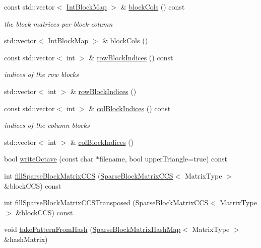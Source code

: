 \begin{DoxyCompactItemize}
const std\+::vector$<$ \hyperlink{classg2o_1_1SparseBlockMatrix_aaa6ca1ae454ed70f62992b6401645f4e}{Int\+Block\+Map} $>$ \& \hyperlink{classg2o_1_1SparseBlockMatrix_a8e53797223fff106487d0b0080a3e36e}{block\+Cols} () const 
\begin{DoxyCompactList}\small\item\em the block matrices per block-\/column \end{DoxyCompactList}\item 
std\+::vector$<$ \hyperlink{classg2o_1_1SparseBlockMatrix_aaa6ca1ae454ed70f62992b6401645f4e}{Int\+Block\+Map} $>$ \& \hyperlink{classg2o_1_1SparseBlockMatrix_a31236f3e11cb7af4979d68fdba3d5e33}{block\+Cols} ()
\item 
const std\+::vector$<$ int $>$ \& \hyperlink{classg2o_1_1SparseBlockMatrix_ab9f9e621c9bca7c660c61b3948b8ece3}{row\+Block\+Indices} () const 
\begin{DoxyCompactList}\small\item\em indices of the row blocks \end{DoxyCompactList}\item 
std\+::vector$<$ int $>$ \& \hyperlink{classg2o_1_1SparseBlockMatrix_a03a2cfdb856c2dac4875889d55ecda84}{row\+Block\+Indices} ()
\item 
const std\+::vector$<$ int $>$ \& \hyperlink{classg2o_1_1SparseBlockMatrix_adfaf13a5f3134205a58c8346a09a672a}{col\+Block\+Indices} () const 
\begin{DoxyCompactList}\small\item\em indices of the column blocks \end{DoxyCompactList}\item 
std\+::vector$<$ int $>$ \& \hyperlink{classg2o_1_1SparseBlockMatrix_aba255bdbb8e0a0d2802ae27e6d4f7cc7}{col\+Block\+Indices} ()
\item 
bool \hyperlink{classg2o_1_1SparseBlockMatrix_a58a311fa5e66df880b29c8abb631474e}{write\+Octave} (const char $\ast$filename, bool upper\+Triangle=true) const 
\item 
int \hyperlink{classg2o_1_1SparseBlockMatrix_a1f596d1bd27de9f62282eee7e65a9f27}{fill\+Sparse\+Block\+Matrix\+C\+CS} (\hyperlink{classg2o_1_1SparseBlockMatrixCCS}{Sparse\+Block\+Matrix\+C\+CS}$<$ Matrix\+Type $>$ \&block\+C\+CS) const 
\item 
int \hyperlink{classg2o_1_1SparseBlockMatrix_a0fbc51ac6aebfceed54a6eb75d2f3ab2}{fill\+Sparse\+Block\+Matrix\+C\+C\+S\+Transposed} (\hyperlink{classg2o_1_1SparseBlockMatrixCCS}{Sparse\+Block\+Matrix\+C\+CS}$<$ Matrix\+Type $>$ \&block\+C\+CS) const 
\item 
void \hyperlink{classg2o_1_1SparseBlockMatrix_a0b1e9dc3a24b0ab41d7002396a61c833}{take\+Pattern\+From\+Hash} (\hyperlink{classg2o_1_1SparseBlockMatrixHashMap}{Sparse\+Block\+Matrix\+Hash\+Map}$<$ Matrix\+Type $>$ \&hash\+Matrix)
\end{DoxyCompactItemize}
